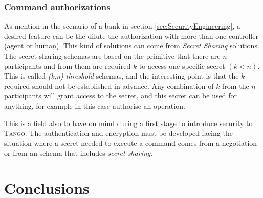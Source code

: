 \documentclass[10pt,a4paper,twoside]{llncs}
\newcommand{\todo}[1]{\texttt{\color{red}TODO:} ``\emph{#1}''}
\newcommand{\tango}{\textsc{Tango}}
\newcommand{\omniorb}{\textsc{omniORB}}
\begin{document}
\subsubsection{Command authorizations}\label{sec:secretSharing}

As mention in the scenario of a bank in section \ref{sec:SecurityEngineering}, a desired feature can be the dilute the authorization with more than one controller (agent or human). This kind of solutions can come from \emph{Secret Sharing} solutions. The secret sharing schemas are based on the primitive that there are $n$ participants and from them are required $k$ to access one specific secret $(k<n)$. This is called \emph{(k,n)-threshold} schemas, and the interesting point is that the $k$ required should not be established in advance. Any combination of $k$ from the $n$ participants will grant access to the secret, and this secret can be used for anything, for example in this case authorise an operation.

This is a field also to have on mind during a first stage to introduce security to \tango. The authentication and encryption must be developed facing the situation where a secret needed to execute a command comes from a negotiation or from an schema that includes \emph{secret sharing}.


    
\section{Conclusions}\label{sec:conclusions}

\end{document}
